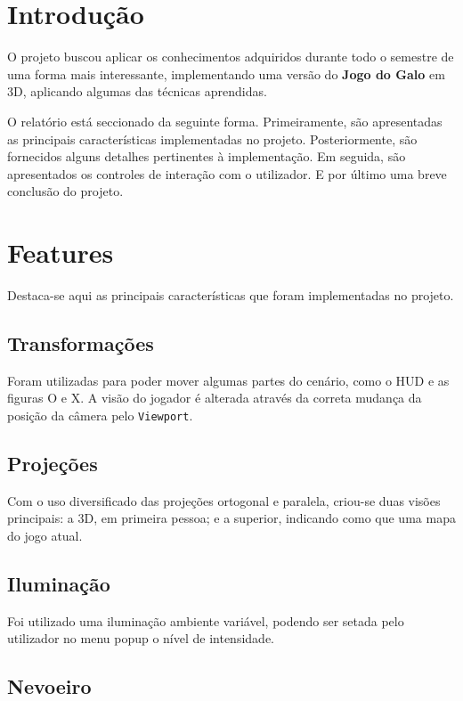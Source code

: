 \documentclass[12pt, onecolumn]{article}
\begin{document}
\section{Introdu\c{c}\~ao}

O projeto buscou aplicar os conhecimentos adquiridos durante todo o semestre de uma forma mais interessante, implementando uma vers\~ao do \textbf{Jogo do Galo} em 3D, aplicando algumas das t\'ecnicas aprendidas.

O relat\'orio est\'a seccionado da seguinte forma. Primeiramente, s\~ao apresentadas as principais caracter\'isticas implementadas no projeto. Posteriormente, s\~ao fornecidos alguns detalhes pertinentes \`a implementa\c{c}\~ao. Em seguida, s\~ao apresentados os controles de intera\c{c}\~ao com o utilizador. E por \'ultimo uma breve conclus\~ao do projeto.


\section{Features}

Destaca-se aqui as principais caracter\'isticas que foram implementadas no projeto.

\subsection{Transforma\c{c}\~oes}

Foram utilizadas para poder mover algumas partes do cen\'ario, como o HUD e as figuras O e X. A vis\~ao do jogador \'e alterada atrav\'es da correta mudan\c{c}a da posi\c{c}\~ao da c\^amera pelo \texttt{Viewport}.

\subsection{Proje\c{c}\~oes}

Com o uso diversificado das proje\c{c}\~oes ortogonal e paralela, criou-se duas vis\~oes principais: a 3D, em primeira pessoa; e a superior, indicando como que uma mapa do jogo atual.

\subsection{Ilumina\c{c}\~ao}

Foi utilizado uma ilumina\c{c}\~ao ambiente vari\'avel, podendo ser setada pelo utilizador no menu popup o n\'ivel de intensidade.

\subsection{Nevoeiro}
\end{document}
